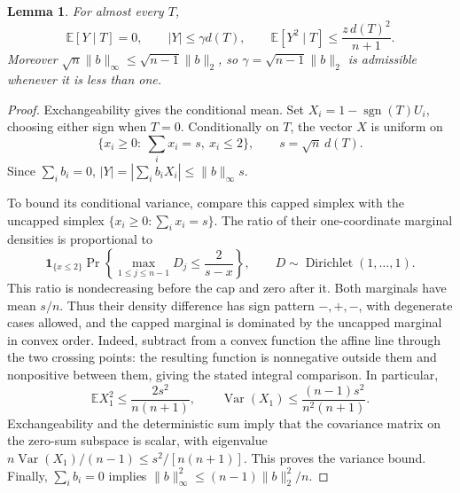 \documentclass[11pt,a4paper]{article}
\newtheorem{lemma}[theorem]{Lemma}
\theoremstyle{remark}\newtheorem{remark}[theorem]{Remark}
\newcommand{\E}{\mathbb E}
\newcommand{\Var}{\operatorname{Var}}
\begin{document}
\begin{lemma}\label{lem:small-conditional}
For almost every $T$,
\[
 \E[Y\mid T]=0,\qquad |Y|\le\gamma d(T),\qquad
 \E[Y^2\mid T]\le\frac{z\,d(T)^2}{n+1}.
\]
Moreover $\sqrt n\|b\|_\infty\le\sqrt{n-1}\|b\|_2$, so
$\gamma=\sqrt{n-1}\|b\|_2$ is admissible whenever it is less than one.
\end{lemma}
\begin{proof}
Exchangeability gives the conditional mean. Set
$X_i=1-\operatorname{sgn}(T)U_i$, choosing either sign when $T=0$.
Conditionally on $T$, the vector $X$ is uniform on
\[
 \{x_i\ge0:\ \textstyle\sum_i x_i=s,\ x_i\le2\},
 \qquad s=\sqrt n\,d(T).
\]
Since $\sum_i b_i=0$, $|Y|=|\sum_i b_iX_i|\le\|b\|_\infty s$.

To bound its conditional variance, compare this capped simplex with the
uncapped simplex $\{x_i\ge0:\sum_i x_i=s\}$. The ratio of their
one-coordinate marginal densities is proportional to
\[
 \mathbf1_{\{x\le2\}}
 \Pr\left\{\max_{1\le j\le n-1}D_j\le\frac2{s-x}\right\},
 \qquad D\sim\operatorname{Dirichlet}(1,\ldots,1).
\]
This ratio is nondecreasing before the cap and zero after it. Both
marginals have mean $s/n$. Thus their density difference has sign pattern
$-,+,-$, with degenerate cases allowed, and the capped marginal is
dominated by the uncapped marginal in convex order. Indeed, subtract
from a convex function the affine line through the two crossing points:
the resulting function is nonnegative outside them and nonpositive
between them, giving the stated integral comparison. In particular,
\[
 \E X_1^2\le\frac{2s^2}{n(n+1)},\qquad
 \Var(X_1)\le\frac{(n-1)s^2}{n^2(n+1)}.
\]
Exchangeability and the deterministic sum imply that the covariance
matrix on the zero-sum subspace is scalar, with eigenvalue
$n\Var(X_1)/(n-1)\le s^2/[n(n+1)]$. This proves the variance bound.
Finally, $\sum_i b_i=0$ implies
$\|b\|_\infty^2\le(n-1)\|b\|_2^2/n$.
\end{proof}
\end{document}

